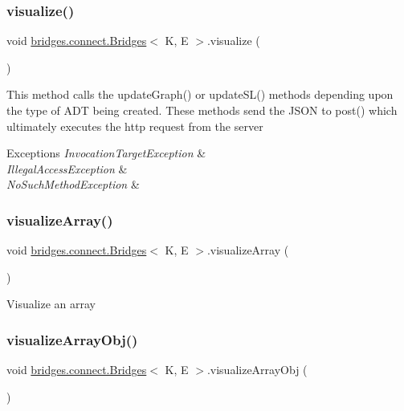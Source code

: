 \subsubsection{\texorpdfstring{visualize()}{visualize()}}
{\footnotesize\ttfamily void \hyperlink{classbridges_1_1connect_1_1_bridges}{bridges.\+connect.\+Bridges}$<$ K, E $>$.visualize (\begin{DoxyParamCaption}{ }\end{DoxyParamCaption})}

This method calls the update\+Graph() or update\+S\+L() methods depending upon the type of A\+DT being created. These methods send the J\+S\+ON to post() which ultimately executes the http request from the server 
\begin{DoxyExceptions}{Exceptions}
{\em Invocation\+Target\+Exception} & \\
\hline
{\em Illegal\+Access\+Exception} & \\
\hline
{\em No\+Such\+Method\+Exception} & \\
\hline
\end{DoxyExceptions}
\hypertarget{classbridges_1_1connect_1_1_bridges_ac4e90699b288fcfbaf19e59bc4dbafb3}{}\label{classbridges_1_1connect_1_1_bridges_ac4e90699b288fcfbaf19e59bc4dbafb3} 
\subsubsection{\texorpdfstring{visualize\+Array()}{visualizeArray()}}
{\footnotesize\ttfamily void \hyperlink{classbridges_1_1connect_1_1_bridges}{bridges.\+connect.\+Bridges}$<$ K, E $>$.visualize\+Array (\begin{DoxyParamCaption}{ }\end{DoxyParamCaption})\hspace{0.3cm}{\ttfamily [protected]}}

Visualize an array \hypertarget{classbridges_1_1connect_1_1_bridges_a7533ebb339527a3a824fc7af21a1d5c9}{}\label{classbridges_1_1connect_1_1_bridges_a7533ebb339527a3a824fc7af21a1d5c9} 
\subsubsection{\texorpdfstring{visualize\+Array\+Obj()}{visualizeArrayObj()}}
{\footnotesize\ttfamily void \hyperlink{classbridges_1_1connect_1_1_bridges}{bridges.\+connect.\+Bridges}$<$ K, E $>$.visualize\+Array\+Obj (\begin{DoxyParamCaption}{ }\end{DoxyParamCaption})\hspace{0.3cm}{\ttfamily [protected]}}


